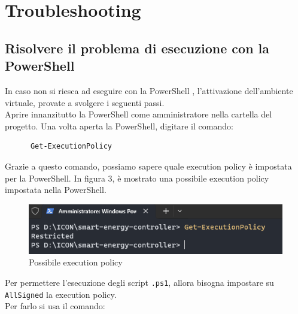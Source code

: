\documentclass[12pt, letterpaper]{article}
\begin{document}



\section{Troubleshooting}

\subsection{Risolvere il problema di esecuzione con la PowerShell}
\label{sec:powershell-error}

In caso non si riesca ad eseguire con la PowerShell \cite{power-shell-resolution},
l'attivazione dell'ambiente virtuale, provate a svolgere i seguenti passi. \\

\noindent Aprire innanzitutto la PowerShell come amministratore nella cartella del progetto.
Una volta aperta la PowerShell, digitare il comando:

\begin{verbatim}
      Get-ExecutionPolicy
\end{verbatim}

\noindent Grazie a questo comando, possiamo sapere quale execution policy è impostata per la PowerShell.
In figura 3, è mostrato una possibile execution policy impostata nella PowerShell. \\

\begin{figure}[h]
      \centering
      \includegraphics{powershell-error.png}
      \caption{Possibile execution policy}
\end{figure}

\noindent Per permettere l'esecuzione degli script \texttt{.ps1}, allora bisogna impostare
su \texttt{AllSigned} la execution policy. \\
\noindent Per farlo si usa il comando: \\
\end{document}
